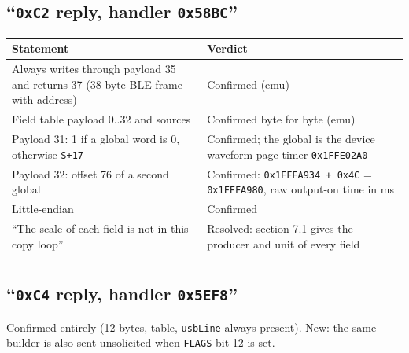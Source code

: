 \subsection{\texorpdfstring{``\texttt{0xC2} reply, handler
\texttt{0x58BC}''}{``0xC2 reply, handler 0x58BC''}}\label{xc2-reply-handler-0x58bc}

{\def\LTcaptype{none} %
\begin{longtable}[]{@{}
  >{\raggedright\arraybackslash}p{}
  >{\raggedright\arraybackslash}p{}@{}}
\toprule\noalign{}
\begin{minipage}[b]{\linewidth}\raggedright
Statement
\end{minipage} & \begin{minipage}[b]{\linewidth}\raggedright
Verdict
\end{minipage} \\
\midrule\noalign{}
\endhead
\bottomrule\noalign{}
\endlastfoot
Always writes through payload 35 and returns 37 (38-byte BLE frame with
address) & Confirmed (emu) \\
Field table payload 0..32 and sources & Confirmed byte for byte (emu) \\
Payload 31: 1 if a global word is 0, otherwise \texttt{S+17} &
Confirmed; the global is the device waveform-page timer
\texttt{0x1FFE02A0} \\
Payload 32: offset 76 of a second global & Confirmed:
\texttt{0x1FFFA934\ +\ 0x4C} = \texttt{0x1FFFA980}, raw output-on time
in ms \\
Little-endian & Confirmed \\
``The scale of each field is not in this copy loop'' & Resolved: section
7.1 gives the producer and unit of every field \\*
\end{longtable}
}

\subsection{\texorpdfstring{``\texttt{0xC4} reply, handler
\texttt{0x5EF8}''}{``0xC4 reply, handler 0x5EF8''}}\label{xc4-reply-handler-0x5ef8}

Confirmed entirely (12 bytes, table, \texttt{usbLine} always present).
New: the same builder is also sent unsolicited when \texttt{FLAGS} bit
12 is set.

